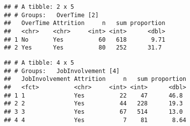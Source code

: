 \documentclass[
]{article}
\newenvironment{Shaded}{\begin{snugshade}}{\end{snugshade}}
\newcommand{\DataTypeTok}[1]{\textcolor[rgb]{0.13,0.29,0.53}{#1}}
\newcommand{\DecValTok}[1]{\textcolor[rgb]{0.00,0.00,0.81}{#1}}
\newcommand{\KeywordTok}[1]{\textcolor[rgb]{0.13,0.29,0.53}{\textbf{#1}}}
\newcommand{\NormalTok}[1]{#1}
\newcommand{\OperatorTok}[1]{\textcolor[rgb]{0.81,0.36,0.00}{\textbf{#1}}}
\newcommand{\StringTok}[1]{\textcolor[rgb]{0.31,0.60,0.02}{#1}}
\begin{document}
\begin{verbatim}
## # A tibble: 2 x 5
## # Groups:   OverTime [2]
##   OverTime Attrition     n   sum proportion
##   <chr>    <chr>     <int> <int>      <dbl>
## 1 No       Yes          60   618       9.71
## 2 Yes      Yes          80   252      31.7
\end{verbatim}

\begin{Shaded}
\end{Shaded}

\begin{verbatim}
## # A tibble: 4 x 5
## # Groups:   JobInvolvement [4]
##   JobInvolvement Attrition     n   sum proportion
##   <fct>          <chr>     <int> <int>      <dbl>
## 1 1              Yes          22    47      46.8 
## 2 2              Yes          44   228      19.3 
## 3 3              Yes          67   514      13.0 
## 4 4              Yes           7    81       8.64
\end{verbatim}

\begin{Shaded}
\end{Shaded}
\end{document}
